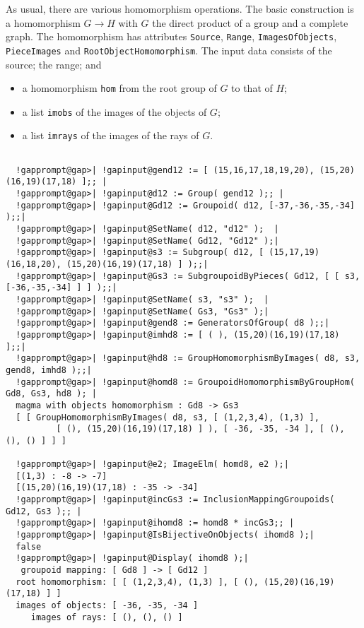 \documentclass[a4paper,11pt]{report}
\begin{document}
{{{ As usual, there are various homomorphism operations. The basic construction is
a homomorphism $G \to H$ with $G$ the direct product of a group and a complete graph. The homomorphism has
attributes \texttt{Source}, \texttt{Range}, \texttt{ImagesOfObjects}, \texttt{PieceImages} and \texttt{RootObjectHomomorphism}. The input data consists of the source; the range; and 
\begin{itemize}
\item  a homomorphism \texttt{hom} from the root group of $G$ to that of $H$; 
\item  a list \texttt{imobs} of the images of the objects of $G$; 
\item  a list \texttt{imrays} of the images of the rays of $G$. 
\end{itemize}
 

 }

 
\begin{Verbatim}[commandchars=!@|,fontsize=\small,frame=single,label=Example]
  
  !gapprompt@gap>| !gapinput@gend12 := [ (15,16,17,18,19,20), (15,20)(16,19)(17,18) ];; |
  !gapprompt@gap>| !gapinput@d12 := Group( gend12 );; |
  !gapprompt@gap>| !gapinput@Gd12 := Groupoid( d12, [-37,-36,-35,-34] );;|
  !gapprompt@gap>| !gapinput@SetName( d12, "d12" );  |
  !gapprompt@gap>| !gapinput@SetName( Gd12, "Gd12" );|
  !gapprompt@gap>| !gapinput@s3 := Subgroup( d12, [ (15,17,19)(16,18,20), (15,20)(16,19)(17,18) ] );;|
  !gapprompt@gap>| !gapinput@Gs3 := SubgroupoidByPieces( Gd12, [ [ s3, [-36,-35,-34] ] ] );;|
  !gapprompt@gap>| !gapinput@SetName( s3, "s3" );  |
  !gapprompt@gap>| !gapinput@SetName( Gs3, "Gs3" );|
  !gapprompt@gap>| !gapinput@gend8 := GeneratorsOfGroup( d8 );;|
  !gapprompt@gap>| !gapinput@imhd8 := [ ( ), (15,20)(16,19)(17,18) ];;|
  !gapprompt@gap>| !gapinput@hd8 := GroupHomomorphismByImages( d8, s3, gend8, imhd8 );;|
  !gapprompt@gap>| !gapinput@homd8 := GroupoidHomomorphismByGroupHom( Gd8, Gs3, hd8 ); |
  magma with objects homomorphism : Gd8 -> Gs3
  [ [ GroupHomomorphismByImages( d8, s3, [ (1,2,3,4), (1,3) ], 
          [ (), (15,20)(16,19)(17,18) ] ), [ -36, -35, -34 ], [ (), (), () ] ] ]
  
  !gapprompt@gap>| !gapinput@e2; ImageElm( homd8, e2 );|
  [(1,3) : -8 -> -7]
  [(15,20)(16,19)(17,18) : -35 -> -34]
  !gapprompt@gap>| !gapinput@incGs3 := InclusionMappingGroupoids( Gd12, Gs3 );; |
  !gapprompt@gap>| !gapinput@ihomd8 := homd8 * incGs3;; |
  !gapprompt@gap>| !gapinput@IsBijectiveOnObjects( ihomd8 );|
  false
  !gapprompt@gap>| !gapinput@Display( ihomd8 );|
   groupoid mapping: [ Gd8 ] -> [ Gd12 ]
  root homomorphism: [ [ (1,2,3,4), (1,3) ], [ (), (15,20)(16,19)(17,18) ] ]
  images of objects: [ -36, -35, -34 ]
     images of rays: [ (), (), () ]
  

\end{Verbatim}}}
\end{document}
